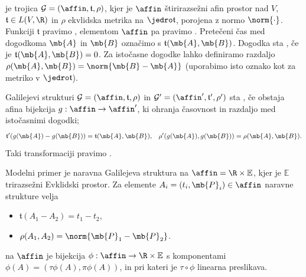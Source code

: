 
\newcommand{\cas}{\mathfrak{t}}
\begin{definicija}
   je trojica $\mathcal{G} = (\affin,
  \cas, \rho)$, kjer je $\affin$ štirirazsežni afin prostor nad $V$, $\cas \in
  L(V, \R)$ in $\rho$ ekvlidska metrika na $\jedro \cas$, porojena z normo
  $\norm{\cdot}$.
  Funkciji $\cas$ pravimo , elementom $\affin$ pa pravimo
  .
  Pretečeni čas med dogodkoma $\mb{A}$ in $\mb{B}$ označimo s $\cas(\mb{A}, \mb{B})$.
  Dogodka sta , če je $\cas(\mb{A}, \mb{B}) = 0$.
  Za istočasne dogodke lahko definiramo razdaljo $\rho(\mb{A}, \mb{B}) = \norm{\mb{B} - \mb{A}}$
  (uporabimo isto oznako kot za metriko v $\jedro\cas$).
\end{definicija}

\begin{definicija}
  Galilejevi strukturi $\mathcal{G} = (\affin, \cas, \rho)$ in $\mathcal{G}' =
  (\affin', \cas', \rho')$ sta , če obstaja afina bijekcija
  $g: \affin \to \affin'$, ki ohranja časovnost in razdaljo med istočasnimi
  dogodki;
  \begin{align*}
    \cas'(g(\mb{A}) - g(\mb{B})) = \cas(\mb{A}, \mb{B}),
    &&
       \rho'(g(\mb{A}), g(\mb{B})) = \rho(\mb{A}, \mb{B}).
  \end{align*}
  Taki transformaciji pravimo .
\end{definicija}


\newcommand{\galileo}{\R\times\mathbb{E}}
Modelni primer je naravna Galilejeva struktura na $\affin = \galileo$, kjer je
$\mathbb{E}$ trirazsežni Evklidski prostor.
Za elemente $A_i = (t_i, \mb{P}_i) \in \affin$ naravne strukture velja
\begin{itemize}
\item $\cas(A_1 - A_2) = t_1 - t_2$,
\item $\rho(A_1, A_2) = \norm{\mb{P}_1 - \mb{P}_2}$.
\end{itemize}

\begin{definicija}
   na $\affin$ je bijekcija $\phi : \affin \to
  \galileo$ s komponentami $\phi(A) = (\tau \phi(A), \pi \phi(A))$, in pri
  kateri je $\tau \circ \phi$ linearna preslikava.
\end{definicija}

